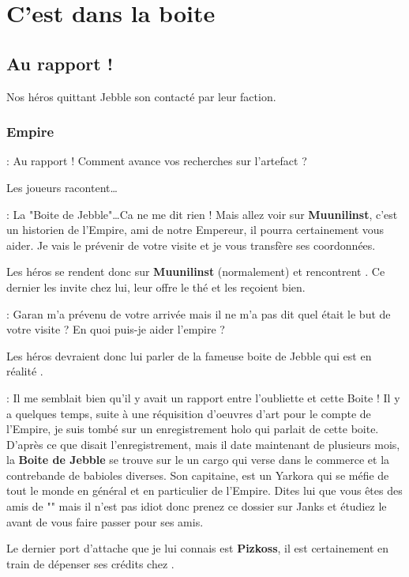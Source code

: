 \section{C’est dans la boite}


\subsection{Au rapport !}
Nos héros quittant Jebble son contacté par leur faction.

\subsubsection{Empire}
\begin{quotebox}
    : Au rapport ! Comment avance vos recherches sur l’artefact ?
\end{quotebox}
Les joueurs racontent\ldots
\begin{quotebox}
    : La "Boite de Jebble"\ldots Ca ne me dit rien ! Mais allez voir  sur \textbf{Muunilinst}, c’est un historien de l’Empire, ami de notre Empereur, il pourra certainement vous aider. Je vais le prévenir de votre visite et je vous transfère ses coordonnées.
\end{quotebox}

Les héros se rendent donc sur \textbf{Muunilinst} (normalement) et rencontrent . Ce dernier les invite chez lui, leur offre le thé et les reçoient bien.
\begin{quotebox}
    : Garan m’a prévenu de votre arrivée mais il ne m’a pas dit quel était le but de votre visite ? En quoi puis-je aider l’empire ?
\end{quotebox}
Les héros devraient donc lui parler de la fameuse boite de Jebble qui est en réalité .

\begin{quotebox}
    : Il me semblait bien qu’il y avait un rapport entre l’oubliette et cette Boite ! Il y a quelques temps, suite à une réquisition d’oeuvres d’art pour le compte de l’Empire, je suis tombé sur un enregistrement holo qui parlait de cette boite. D’après ce que disait l’enregistrement, mais il date maintenant de plusieurs mois, la \textbf{Boite de Jebble} se trouve sur le  un cargo qui verse dans le commerce et la contrebande de babioles diverses. Son capitaine,  est un Yarkora qui se méfie de tout le monde en général et en particulier de l’Empire. Dites lui que vous êtes des amis de "\textbf{}" mais il n’est pas idiot donc prenez ce dossier sur Janks et étudiez le avant de vous faire passer pour ses amis.

    Le dernier port d’attache que je lui connais est \textbf{Pizkoss}, il est certainement en train de dépenser ses crédits chez .
\end{quotebox}


